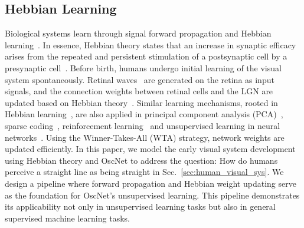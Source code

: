 \subsection{Hebbian Learning}
Biological systems learn through signal forward propagation and Hebbian learning~\cite{hebbian_bio_1,hebbian_bio_2}. In essence, Hebbian theory states that an increase in synaptic efficacy arises from the repeated and persistent stimulation of a postsynaptic cell by a presynaptic cell~\cite{hebbian_synaptic_1,hebbian_synaptic_2}.
Before birth, humans undergo initial learning of the visual system spontaneously. Retinal waves~\cite{retinal_wave_1,retinal_wave_2,retinal_wave_3,retinal_wave_4,retinal_wave_5,retinal_wave_6,retinal_wave_7} are generated on the retina as input signals, and the connection weights between retinal cells and the LGN are updated based on Hebbian theory~\cite{retina_grow_nips}. 
Similar learning mechanisms, rooted in Hebbian learning~\cite{hebbian_math_1}, are also applied in principal component analysis (PCA)~\cite{hebbian_pca}, sparse coding~\cite{hebbian_sparse_coding}, reinforcement learning~\cite{hebbian_control_1, hebbian_control_2} and unsupervised learning in neural networks~\cite{hebbian_unsupervised_1,hebbian_unsupervised_2,hebbian_unsupervised_3,hebbian_unsupervised_4, hebbian_unsupervised_5,hebbian_unsupervised_6}. Using the Winner-Takes-All (WTA) strategy, network weights are updated efficiently.
In this paper, we model the early visual system development using Hebbian theory and OscNet to address the question: How do humans perceive a straight line as being straight in Sec.~\ref{sec:human_visual_sys}. We design a pipeline where forward propagation and Hebbian weight updating serve as the foundation for OscNet's unsupervised learning. This pipeline demonstrates its applicability not only in unsupervised learning tasks but also in general supervised machine learning tasks.